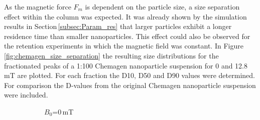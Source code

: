 As the magnetic force $F_{m}$ is dependent on the particle size, a size separation effect within the column was expected. It was already shown by the simulation results in Section\,\ref{subsec:Param_res} that larger particles exhibit a longer residence time than smaller nanoparticles. This effect could also be observed for the retention experiments in which the magnetic field was constant. In Figure\,\ref{fig:chemagen_size_separation} the resulting size distributions for the fractionated peaks of a 1:100 Chemagen nanoparticle suspension for 0 and 12.8\,mT are plotted. For each fraction the D10, D50 and D90 values were determined. For comparison the D-values from the original Chemagen nanoparticle suspension were included. 

\begin{figure}[H]
          \begin{subfigure}{0.49\textwidth}
                  \flushleft
                  \caption{$B_{0}$=0\,mT}\label{subfig:chemagen_size_0mT}
          \end{subfigure}\hfill
        \begin{subfigure}{0.49\textwidth}
                \flushright

\end{subfigure}
\end{figure}
